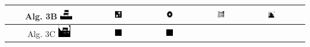 \begin{table}
\centering
\begin{tabular}{cccccc}\hline
Alg. 3B\quad
\includegraphics[width=0.15\textwidth]{img/res/e3a/alg3btipo-chair.jpg} &
\includegraphics[width=0.15\textwidth]{img/res/e3a/alg3btipo-block.jpg} &
\includegraphics[width=0.15\textwidth]{img/res/e3a/alg3btipo-02.jpg} &
\includegraphics[width=0.15\textwidth]{img/res/e3a/alg3btipo-09.jpg} &
\includegraphics[width=0.15\textwidth]{img/res/e3a/alg3btipo-07.jpg}\\\hline
Alg. 3C\quad     
\includegraphics[width=0.15\textwidth]{img/res/e3a/alg3ctipo-chair.jpg} &
\includegraphics[width=0.15\textwidth]{img/res/e3a/alg3ctipo-block.jpg} &
\includegraphics[width=0.15\textwidth]{img/res/e3a/alg3ctipo-02.jpg} &

\end{tabular}
\end{table}
